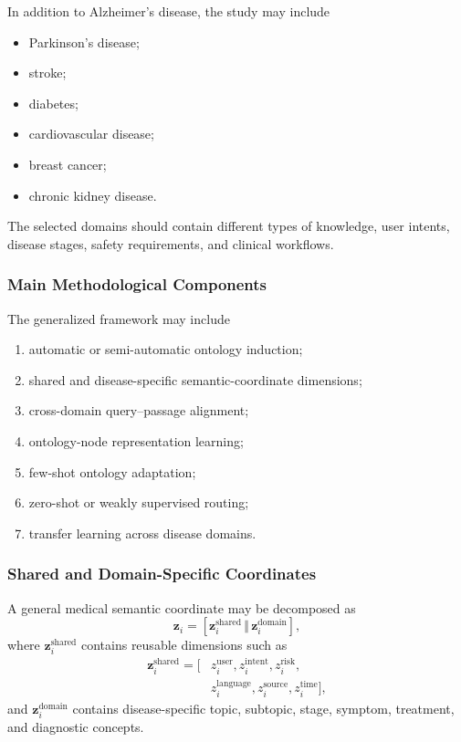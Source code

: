 \documentclass{article}
\begin{document}
In addition to Alzheimer's disease, the study may include
\begin{itemize}
    \item Parkinson's disease;
    \item stroke;
    \item diabetes;
    \item cardiovascular disease;
    \item breast cancer;
    \item chronic kidney disease.
\end{itemize}
The selected domains should contain different types of knowledge, user intents, disease stages, safety requirements, and clinical workflows.

\subsubsection{Main Methodological Components}

The generalized framework may include
\begin{enumerate}
    \item automatic or semi-automatic ontology induction;
    \item shared and disease-specific semantic-coordinate dimensions;
    \item cross-domain query--passage alignment;
    \item ontology-node representation learning;
    \item few-shot ontology adaptation;
    \item zero-shot or weakly supervised routing;
    \item transfer learning across disease domains.
\end{enumerate}

\subsubsection{Shared and Domain-Specific Coordinates}

A general medical semantic coordinate may be decomposed as
\begin{equation}
    \mathbf{z}_i
    =
    \left[
    \mathbf{z}_i^{\mathrm{shared}}
    \,\Vert\,
    \mathbf{z}_i^{\mathrm{domain}}
    \right],
\end{equation}
where $\mathbf{z}_i^{\mathrm{shared}}$ contains reusable dimensions such as
\begin{equation}
\begin{split}
    \mathbf{z}_i^{\mathrm{shared}}
    =
    [&
    z_i^{\mathrm{user}},
    z_i^{\mathrm{intent}},
    z_i^{\mathrm{risk}},\\
    &
    z_i^{\mathrm{language}},
    z_i^{\mathrm{source}},
    z_i^{\mathrm{time}}
    ],
\end{split}
\end{equation}
and $\mathbf{z}_i^{\mathrm{domain}}$ contains disease-specific topic, subtopic, stage, symptom, treatment, and diagnostic concepts.
\end{document}
